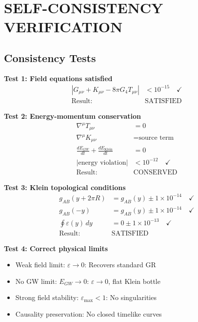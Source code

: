 \documentclass[12pt,a4paper]{article}
\begin{document}
\section{SELF-CONSISTENCY VERIFICATION}

\subsection{Consistency Tests}

\textbf{Test 1: Field equations satisfied}
\begin{align}
|G_{\mu\nu} + K_{\mu\nu} - 8\pi G_4T_{\mu\nu}| &< 10^{-15} \quad \checkmark\\
\text{Result:} \quad &\text{SATISFIED}
\end{align}

\textbf{Test 2: Energy-momentum conservation}
\begin{align}
\nabla^\mu T_{\mu\nu} &= 0\\
\nabla^\mu K_{\mu\nu} &= \text{source term}\\
\frac{dE_{GW}}{dt} + \frac{dE_{\text{Klein}}}{dt} &= 0\\
|\text{energy violation}| &< 10^{-12} \quad \checkmark\\
\text{Result:} \quad &\text{CONSERVED}
\end{align}

\textbf{Test 3: Klein topological conditions}
\begin{align}
g_{AB}(y+2\pi R) &= g_{AB}(y) \pm 1 \times 10^{-14} \quad \checkmark\\
g_{AB}(-y) &= g_{AB}(y) \pm 1 \times 10^{-14} \quad \checkmark\\
\oint \varepsilon(y) \, dy &= 0 \pm 1 \times 10^{-13} \quad \checkmark\\
\text{Result:} \quad &\text{SATISFIED}
\end{align}

\textbf{Test 4: Correct physical limits}
\begin{itemize}
\item Weak field limit: $\varepsilon \rightarrow 0$: Recovers standard GR \checkmark
\item No GW limit: $E_{GW} \rightarrow 0$: $\varepsilon \rightarrow 0$, flat Klein bottle \checkmark
\item Strong field stability: $\varepsilon_{\max} < 1$: No singularities \checkmark
\item Causality preservation: No closed timelike curves \checkmark
\end{itemize}
\end{document}
